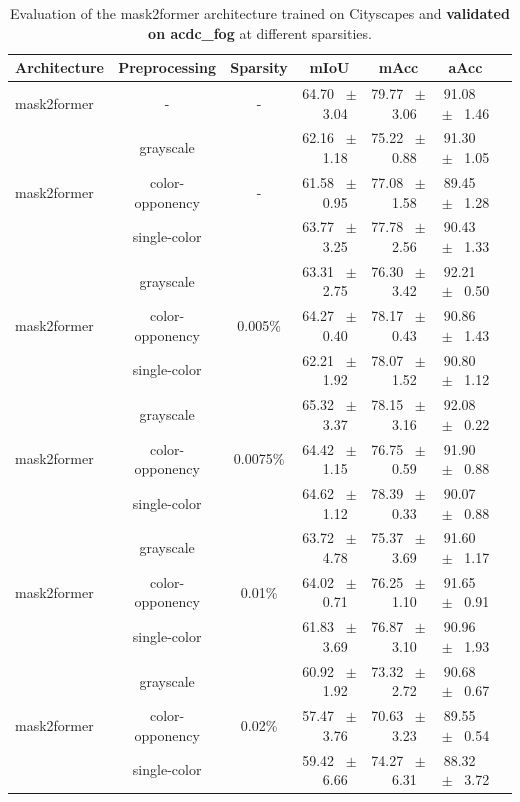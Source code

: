 \begin{table}[h]
  \centering
  \caption{Evaluation of the mask2former architecture trained on Cityscapes and \textbf{validated on acdc_fog} at different sparsities.}
  \begin{tabular}{@{}lccc ccc@{}}
    \toprule
    Architecture & Preprocessing & Sparsity & mIoU & mAcc & aAcc \\
    \midrule
    mask2former & - & - & 64.70 ~$\pm$~ 3.04 & 79.77 ~$\pm$~ 3.06 & 91.08 ~$\pm$~ 1.46 \\
    \midrule
    \midrule
    \multirow{3}{*}{mask2former} & grayscale & \multirow{3}{*}{-} & 62.16 ~$\pm$~ 1.18 & 75.22 ~$\pm$~ 0.88 & 91.30 ~$\pm$~ 1.05 \\
    & color-opponency & & 61.58 ~$\pm$~ 0.95 & 77.08 ~$\pm$~ 1.58 & 89.45 ~$\pm$~ 1.28 \\
    & single-color & & 63.77 ~$\pm$~ 3.25 & 77.78 ~$\pm$~ 2.56 & 90.43 ~$\pm$~ 1.33 \\
    \midrule
    \multirow{3}{*}{mask2former} & grayscale & \multirow{3}{*}{0.005\%} & 63.31 ~$\pm$~ 2.75 & 76.30 ~$\pm$~ 3.42 & 92.21 ~$\pm$~ 0.50 \\
    & color-opponency & & 64.27 ~$\pm$~ 0.40 & 78.17 ~$\pm$~ 0.43 & 90.86 ~$\pm$~ 1.43 \\
    & single-color & & 62.21 ~$\pm$~ 1.92 & 78.07 ~$\pm$~ 1.52 & 90.80 ~$\pm$~ 1.12 \\
    \midrule
    \multirow{3}{*}{mask2former} & grayscale & \multirow{3}{*}{0.0075\%} & 65.32 ~$\pm$~ 3.37 & 78.15 ~$\pm$~ 3.16 & 92.08 ~$\pm$~ 0.22 \\
    & color-opponency & & 64.42 ~$\pm$~ 1.15 & 76.75 ~$\pm$~ 0.59 & 91.90 ~$\pm$~ 0.88 \\
    & single-color & & 64.62 ~$\pm$~ 1.12 & 78.39 ~$\pm$~ 0.33 & 90.07 ~$\pm$~ 0.88 \\
    \midrule
    \multirow{3}{*}{mask2former} & grayscale & \multirow{3}{*}{0.01\%} & 63.72 ~$\pm$~ 4.78 & 75.37 ~$\pm$~ 3.69 & 91.60 ~$\pm$~ 1.17 \\
    & color-opponency & & 64.02 ~$\pm$~ 0.71 & 76.25 ~$\pm$~ 1.10 & 91.65 ~$\pm$~ 0.91 \\
    & single-color & & 61.83 ~$\pm$~ 3.69 & 76.87 ~$\pm$~ 3.10 & 90.96 ~$\pm$~ 1.93 \\
    \midrule
    \multirow{3}{*}{mask2former} & grayscale & \multirow{3}{*}{0.02\%} & 60.92 ~$\pm$~ 1.92 & 73.32 ~$\pm$~ 2.72 & 90.68 ~$\pm$~ 0.67 \\
    & color-opponency & & 57.47 ~$\pm$~ 3.76 & 70.63 ~$\pm$~ 3.23 & 89.55 ~$\pm$~ 0.54 \\
    & single-color & & 59.42 ~$\pm$~ 6.66 & 74.27 ~$\pm$~ 6.31 & 88.32 ~$\pm$~ 3.72 \\
    \midrule
    \bottomrule
  \end{tabular}
  \label{tab:sparse_mask2former_acdc_fog}
\end{table}